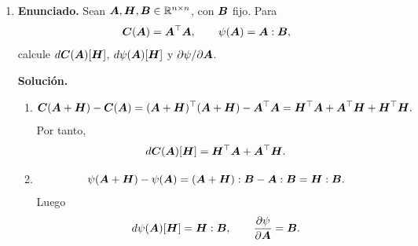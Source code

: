 \documentclass[11pt]{article}
\newcommand{\pd}[2]{\frac{\partial #1}{\partial #2}}
\newcommand{\norm}[1]{\left\lVert #1\right\rVert}
\newcommand{\abs}[1]{\left|#1\right|}
\def\ten   #1{\mbox{\boldmath $#1$}{}}
\def\dx{\mbox{\(\,\mathrm{d}x\)}}
\def\R{\mathbb R}
\begin{document}
\begin{enumerate}[label=\textbf{\arabic*.}, leftmargin=*]
\begin{enumerate}[label=(\alph*)]
        \item Definamos
        \[
            L_u(h)=\int_\Omega (u+\alpha u^3-f)h\dx.
        \]
        Es lineal, y además
        \[
            \abs{L_u(h)}
            \le
            \left(|\Omega|\norm{u+\alpha u^3}_{L^\infty(\Omega)}+\norm{f}_{L^1(\Omega)}\right)
            \norm{h}_{L^\infty(\Omega)}.
        \]
        Luego $L_u\in (L^\infty(\Omega))'$. Para el resto,
        \begin{align*}
            J(u+h)-J(u)-L_u(h)
            &=
            \int_\Omega
            \left[
            \frac12h^2
            +\frac{\alpha}{4}\left((u+h)^4-u^4-4u^3h\right)
            \right]\dx\\
            &=
            \int_\Omega
            \left[
            \frac12h^2
            +\frac{3\alpha}{2}u^2h^2
            +\alpha uh^3
            +\frac{\alpha}{4}h^4
            \right]\dx.
        \end{align*}
        Así,
        \[
            \abs{J(u+h)-J(u)-L_u(h)}
            \le
            C(u,\alpha,\Omega)\left(\norm{h}_{L^\infty}^2+\norm{h}_{L^\infty}^3+\norm{h}_{L^\infty}^4\right),
        \]
        y por ende el cociente por $\norm{h}_{L^\infty}$ tiende a cero. Entonces $J$ es Fréchet diferenciable y
        \[
            dJ(u)[h]=\int_\Omega (u+\alpha u^3-f)h\dx.
        \]
    \end{enumerate}

    \item \textbf{Enunciado.} Sean $\ten A,\ten H,\ten B\in\R^{n\times n}$, con $\ten B$ fijo. Para
    \[
        \ten C(\ten A)=\ten A^\top\ten A,
        \qquad
        \psi(\ten A)=\ten A:\ten B,
    \]
    calcule $d\ten C(\ten A)[\ten H]$, $d\psi(\ten A)[\ten H]$ y $\partial\psi/\partial\ten A$.

    \textbf{Solución.}
    \begin{enumerate}[label=(\alph*)]
        \item
        \[
            \ten C(\ten A+\ten H)-\ten C(\ten A)
            =
            (\ten A+\ten H)^\top(\ten A+\ten H)-\ten A^\top\ten A
            =
            \ten H^\top\ten A+\ten A^\top\ten H+\ten H^\top\ten H.
        \]
        Por tanto,
        \[
            d\ten C(\ten A)[\ten H]=\ten H^\top\ten A+\ten A^\top\ten H.
        \]

        \item
        \[
            \psi(\ten A+\ten H)-\psi(\ten A)
            =
            (\ten A+\ten H):\ten B-\ten A:\ten B
            =
            \ten H:\ten B.
        \]
        Luego
        \[
            d\psi(\ten A)[\ten H]=\ten H:\ten B,
            \qquad
            \pd{\psi}{\ten A}=\ten B.
        \]
    \end{enumerate}


\end{enumerate}
\end{document}
